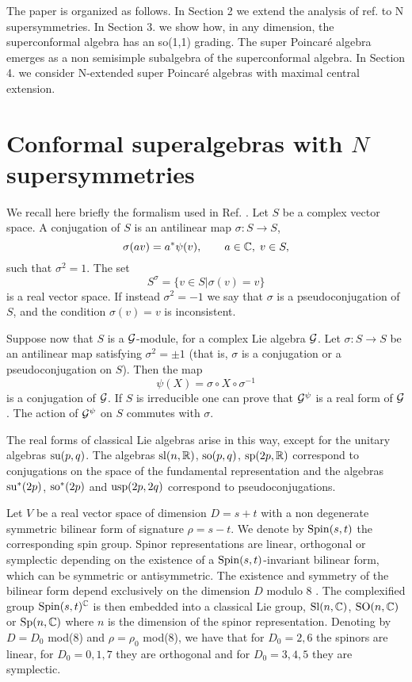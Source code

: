 \documentclass[a4paper,12pt]{article}
\begin{document}
The paper is organized as follows. In Section 2 we extend the
analysis of ref. \cite{dflv} to N supersymmetries. In Section 3.
we show how, in any dimension, the superconformal algebra has an
so(1,1) grading. The super  Poincar\'e algebra emerges as a non
semisimple subalgebra of the superconformal algebra. In Section 4.
we consider N-extended super Poincar\'e algebras with maximal
central extension.






\section{Conformal superalgebras with $N$ supersymmetries}

We recall here briefly the formalism used in Ref. \cite{dflv}. Let
 $S$ be a complex vector space. A conjugation of $S$ is
an antilinear  map $\sigma:S\rightarrow S$,
$$\sigma(av)=a^*\psi(v), \qquad a\in \mathbb{C},\; v\in S,$$ such that
$\sigma^2=1$. The set $$S^\sigma=\{v\in S|\sigma(v)=v\}$$ is a
real vector space. If instead $\sigma^2=-1$ we say that $\sigma$
is a pseudoconjugation of $S$, and the condition $\sigma(v)=v$ is
inconsistent.



 Suppose
now that  $S$ is  a $\mathcal{G}$-module, for a complex Lie algebra $\mathcal{G}$.
Let $\sigma:S\rightarrow S$ be an antilinear map satisfying
$\sigma^2=\pm1$ (that is, $\sigma$ is a conjugation or a
pseudoconjugation on $S$). Then the map $$\psi(X)=\sigma\circ
X\circ\sigma^{-1}$$ is a conjugation of $\mathcal{G}$. If $S$ is
irreducible one can prove that  $\mathcal{G}^\psi$ is a real form of $\mathcal{G}$.
The action of $\mathcal{G}^\psi$ on $S$ commutes with $\sigma$.

The real forms of classical Lie algebras arise in this way, except
for the unitary algebras ${\rm su}(p,q)$. The algebras ${\rm
sl}(n,\mathbb{R})$, ${\rm so}(p,q)$, ${\rm sp}(2p,\mathbb{R})$ correspond to
conjugations on the space of the fundamental representation and
the algebras ${\rm su}^*(2p)$, ${\rm so}^*(2p)$ and ${\rm
usp}(2p,2q)$ correspond to pseudoconjugations.

\smallskip

Let $V$ be a real vector space of dimension $D=s+t$ with  a non
degenerate symmetric bilinear form  of signature  $\rho=s-t$. We
denote by ${\rm Spin}(s,t)$ the corresponding spin  group. Spinor
representations are linear, orthogonal or symplectic depending on
the existence of a ${\rm Spin}(s,t)$-invariant  bilinear form,
which can be symmetric or antisymmetric. The existence and
symmetry of the bilinear form depend exclusively on the dimension
$D$ modulo 8 \cite{de}. The complexified group ${\rm
Spin}(s,t)^{\mathbb{C}}$ is then embedded into a classical Lie group, ${\rm
Sl}(n,\mathbb{C})$, ${\rm SO}(n,\mathbb{C})$ or ${\rm Sp}(n,\mathbb{C})$ where $n$ is the
dimension of the spinor representation. Denoting by $D=D_0$ mod(8)
and  $\rho=\rho_0$ mod(8), we have that  for $D_0=2,6$ the spinors
are linear, for $D_0=0, 1,7$ they are orthogonal and for $D_0=3,4,
5$ they are symplectic.
\end{document}
